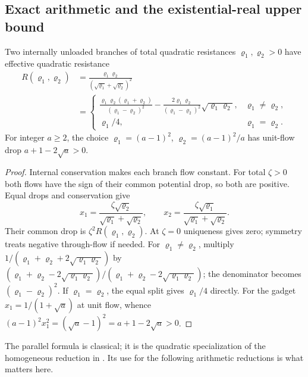 \subsection{Exact arithmetic and the existential-real upper bound}
\label{subsec:a-cac-arithmetic}
\begin{lemma}
\label{lem:a-cac-radical}
Two internally unloaded branches of total quadratic resistances
$\varrho_1,\varrho_2>0$ have effective quadratic resistance
\begin{equation}
 \begin{aligned}
 R(\varrho_1,\varrho_2)
 &=\frac{\varrho_1\varrho_2}{(\sqrt{\varrho_1}+\sqrt{\varrho_2})^2}\\
 &=\begin{cases}
 \displaystyle\frac{\varrho_1\varrho_2(\varrho_1+\varrho_2)}{(\varrho_1-\varrho_2)^2}
       -\frac{2\varrho_1\varrho_2}{(\varrho_1-\varrho_2)^2}\sqrt{\varrho_1\varrho_2},&\varrho_1\ne \varrho_2,\\[5pt]
 \varrho_1/4,&\varrho_1=\varrho_2.
 \end{cases}
 \end{aligned}
 \label{eq:a-cac-parallel}
\end{equation}
For integer $a\ge2$, the choice $\varrho_1=(a-1)^2$, $\varrho_2=(a-1)^2/a$
has unit-flow drop $a+1-2\sqrt a>0$.
\end{lemma}
\begin{proof}
Internal conservation makes each branch flow constant. For total
$\zeta>0$ both flows have the sign of their common potential drop, so both
are positive. Equal drops and conservation give
\[
 x_1=\frac{\zeta\sqrt{\varrho_2}}{\sqrt{\varrho_1}+\sqrt{\varrho_2}},\qquad
 x_2=\frac{\zeta\sqrt{\varrho_1}}{\sqrt{\varrho_1}+\sqrt{\varrho_2}}.
\]
Their common drop is $\zeta^2R(\varrho_1,\varrho_2)$. At $\zeta=0$ uniqueness gives zero;
symmetry treats negative through-flow if needed. For $\varrho_1\ne \varrho_2$,
multiply $1/(\varrho_1+\varrho_2+2\sqrt{\varrho_1\varrho_2})$ by
$(\varrho_1+\varrho_2-2\sqrt{\varrho_1\varrho_2})/(\varrho_1+\varrho_2-2\sqrt{\varrho_1\varrho_2})$; the denominator becomes
$(\varrho_1-\varrho_2)^2$. If $\varrho_1=\varrho_2$, the equal split gives $\varrho_1/4$ directly.
For the gadget $x_1=1/(1+\sqrt a)$ at unit flow, whence
$(a-1)^2x_1^2=(\sqrt a-1)^2=a+1-2\sqrt a>0$.
\end{proof}

The parallel formula is classical; it is the quadratic specialization
of the homogeneous reduction in
\citet[Lemma 4.2]{gro2017-algorithmic-results-for-potential-based}.
Its use for the following arithmetic reductions is what matters here.

